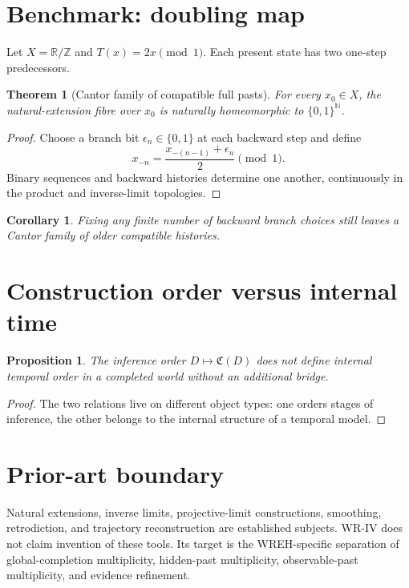 \documentclass[11pt]{article}
\newtheorem{proposition}[definition]{Proposition}
\newtheorem{theorem}[definition]{Theorem}
\newtheorem{corollary}[definition]{Corollary}
\newcommand{\Ccal}{\mathfrak C}
\begin{document}
\section{Benchmark: doubling map}
Let $X=\mathbb R/\mathbb Z$ and $T(x)=2x\pmod1$. Each present state has two one-step predecessors.
\begin{theorem}[Cantor family of compatible full pasts]
For every $x_0\in X$, the natural-extension fibre over $x_0$ is naturally homeomorphic to $\{0,1\}^{\mathbb N}$.
\end{theorem}
\begin{proof}
Choose a branch bit $\epsilon_n\in\{0,1\}$ at each backward step and define
\[
x_{-n}=\frac{x_{-(n-1)}+\epsilon_n}{2}\pmod1.
\]
Binary sequences and backward histories determine one another, continuously in the product and inverse-limit topologies.
\end{proof}
\begin{corollary}
Fixing any finite number of backward branch choices still leaves a Cantor family of older compatible histories.
\end{corollary}

\section{Construction order versus internal time}
\begin{proposition}
The inference order $D\mapsto\Ccal(D)$ does not define internal temporal order in a completed world without an additional bridge.
\end{proposition}
\begin{proof}
The two relations live on different object types: one orders stages of inference, the other belongs to the internal structure of a temporal model.
\end{proof}

\section{Prior-art boundary}
Natural extensions, inverse limits, projective-limit constructions, smoothing, retrodiction, and trajectory reconstruction are established subjects. WR-IV does not claim invention of these tools. Its target is the WREH-specific separation of global-completion multiplicity, hidden-past multiplicity, observable-past multiplicity, and evidence refinement.
\end{document}
